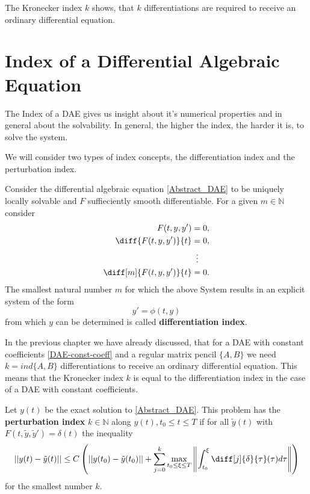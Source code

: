 The Kronecker index $k$ shows, that $k$ differentiations are required to receive an ordinary differential equation.

\section{Index of a Differential Algebraic Equation}

The Index of a DAE gives us insight about it's numerical properties and in general about the solvability. In general, the higher the index, the harder it is, to solve the system. 

We will consider two types of index concepts, the differentiation index and the perturbation index.

\begin{definition}
	Consider the differential algebraic equation \ref{Abstract_DAE} to be uniquely locally solvable and $F$ suffieciently smooth differentiable. For a given $m \in \mathbb{N}$ consider
	\begin{displaymath}
		\begin{aligned}
			F(t,y,y') &= 0, \\
			\diff{F(t,y,y')}{t} &= 0, \\
			&\vdotswithin{=} \\
			\diff[m]{F(t,y,y')}{t} &= 0.
		\end{aligned}
	\end{displaymath}
	The smallest natural number $m$ for which the above System results in an explicit system of the form
	\begin{displaymath}
		y' = \phi(t,y)
	\end{displaymath}
	from which $y$ can be determined is called \textbf{differentiation index}.
\end{definition}

In the previous chapter we have already discussed, that for a DAE with constant coefficients \ref{DAE-const-coeff} and a regular matrix pencil $\{A,B\}$  we need $k = ind\{A,B\}$ differentiations to receive an ordinary differential equation. This means that the Kronecker index $k$ is equal to the differentiation index in the case of a DAE with constant coefficients.

\begin{definition}
	Let $y(t)$ be the exact solution to \ref{Abstract_DAE}. This problem has the \textbf{perturbation index} $k \in \mathbb{N}$ along $y(t), t_0 \leq t \leq T$ if for all  $\tilde{y}(t)$ with $F(t, \tilde{y}, \tilde{y}') = \delta(t)$ the inequality
	\begin{displaymath}
		||y(t)-\tilde{y}(t)|| \leq C \left(||y(t_0)-\tilde{y}(t_0)||+\sum_{j=0}^{k}\max_{t_0 \leq \xi \leq T} \left\rVert 		\int_{t_0}^{\xi}\diff[j]{\delta}{\tau}(\tau)d \tau \right\rVert \right)
	\end{displaymath}
	for the smallest number $k$.
\end{definition}	


